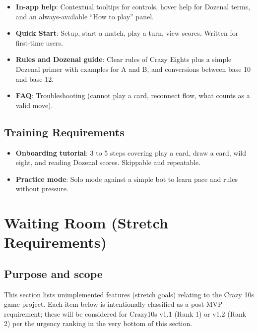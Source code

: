 \documentclass[12pt]{article}
\begin{document}
\begin{itemize}
  \item \textbf{In-app help}: Contextual tooltips for controls, hover help for Dozenal terms, and an always-available ``How to play'' panel.
  \item \textbf{Quick Start}: Setup, start a match, play a turn, view scores. Written for first-time users.
  \item \textbf{Rules and Dozenal guide}: Clear rules of Crazy Eights plus a simple Dozenal primer with examples for A and B, and conversions between base 10 and base 12.
  \item \textbf{FAQ}: Troubleshooting (cannot play a card, reconnect flow, what counts as a valid move).
\end{itemize}

\subsection{Training Requirements}
\begin{itemize}
  \item \textbf{Onboarding tutorial}: 3 to 5 steps covering play a card, draw a card, wild eight, and reading Dozenal scores. Skippable and repeatable.
  \item \textbf{Practice mode}: Solo mode against a simple bot to learn pace and rules without pressure.
\end{itemize}



\section{Waiting Room (Stretch Requirements)}

\subsection{Purpose and scope}
This section lists unimplemented features (stretch goals) relating to the Crazy 10s game project. Each item below is intentionally classified as a post-MVP requirement; these will be considered for Crazy10s v1.1 (Rank 1) or v1.2 (Rank 2) per the urgency ranking in the very bottom of this section.
\end{document}
